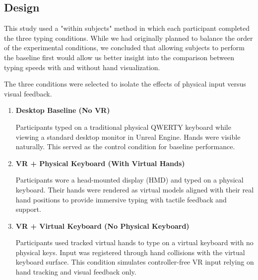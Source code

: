 \documentclass[acmlarge]{acmart}
\begin{document}
\subsection{Design}

This study used a "within subjects" method in which each participant completed the three typing conditions. While we had originally planned to balance the order of the experimental conditions, we concluded that allowing subjects to perform the baseline first would allow us better insight into the comparison between typing speeds with and without hand visualization.


The three conditions were selected to isolate the effects of physical input versus visual feedback.


\begin{enumerate}
    \item \textbf{Desktop Baseline (No VR)}  
    
    Participants typed on a traditional physical QWERTY keyboard while viewing a standard desktop monitor in Unreal Engine. Hands were visible naturally. This served as the control condition for baseline performance.

    \item \textbf{VR + Physical Keyboard (With Virtual Hands)}  
    
    Participants wore a head-mounted display (HMD) and typed on a physical keyboard. Their hands were rendered as virtual models aligned with their real hand positions to provide immersive typing with tactile feedback and support.

    \item \textbf{VR + Virtual Keyboard (No Physical Keyboard)}  
    
    Participants used tracked virtual hands to type on a virtual keyboard with no physical keys. Input was registered through hand collisions with the virtual keyboard surface. This condition simulates controller-free VR input relying on hand tracking and visual feedback only.
\end{enumerate}
\end{document}
